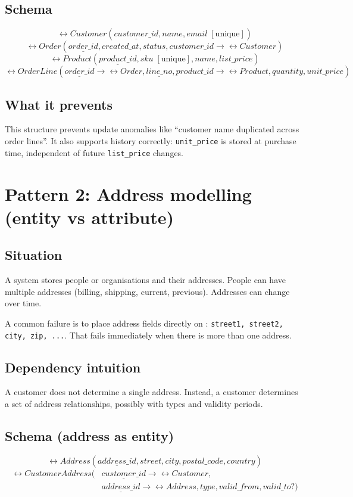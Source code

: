 \subsection{Schema}
\[
\rel{Customer}(\underline{customer\_id}, name, email \;[\text{unique}])
\]
\[
\rel{Order}(\underline{order\_id}, created\_at, status, customer\_id \rightarrow \rel{Customer})
\]
\[
\rel{Product}(\underline{product\_id}, sku \;[\text{unique}], name, list\_price)
\]
\[
\rel{OrderLine}(\underline{order\_id} \rightarrow \rel{Order}, \underline{line\_no}, product\_id \rightarrow \rel{Product}, quantity, unit\_price)
\]

\subsection{What it prevents}
This structure prevents update anomalies like “customer name duplicated across order lines”.
It also supports history correctly: \texttt{unit\_price} is stored at purchase time, independent of future \texttt{list\_price} changes.

\section{Pattern 2: Address modelling (entity vs attribute)}
\subsection{Situation}
A system stores people or organisations and their addresses.
People can have multiple addresses (billing, shipping, current, previous).
Addresses can change over time.

A common failure is to place address fields directly on :
\texttt{street1, street2, city, zip, ...}.
That fails immediately when there is more than one address.

\subsection{Dependency intuition}
A customer does not determine a single address.
Instead, a customer determines a set of address relationships, possibly with types and validity periods.

\subsection{Schema (address as entity)}
\[
\rel{Address}(\underline{address\_id}, street, city, postal\_code, country)
\]
\[
\begin{aligned}
\rel{CustomerAddress}(&\underline{customer\_id} \rightarrow \rel{Customer}, \\
&\underline{address\_id} \rightarrow \rel{Address}, type, valid\_from, valid\_to?)
\end{aligned}
\]

